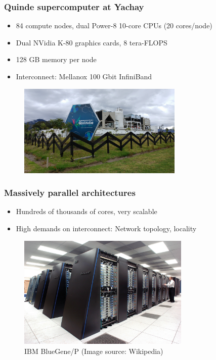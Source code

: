 \documentclass[usenames,dvipsnames,mathserif,compress]{beamer}
\begin{document}
\begin{frame}
  \frametitle{Quinde supercomputer at Yachay}
  \begin{itemize}
  \item 84 compute nodes, dual Power-8 10-core CPUs (20 cores/node)
  \item Dual NVidia K-80 graphics cards, 8 tera-FLOPS
  \item 128 GB memory per node
  \item Interconnect: Mellanox 100 Gbit InfiniBand
  \end{itemize}
  \vspace{-5mm}
  \begin{figure}
  \includegraphics[width=0.7\textwidth]{quinde.jpg}
  \end{figure}
\end{frame}

\begin{frame}
  \frametitle{Massively parallel architectures}
  \begin{itemize}
  \item Hundreds of thousands of cores, very scalable
  \item High demands on interconnect: Network topology, locality
  \end{itemize}
  \begin{figure}
    \includegraphics[width=0.73\textwidth]{IBM_Blue_Gene_P_supercomputer.jpg}
    \caption{IBM BlueGene/P (Image source: Wikipedia)}
  \end{figure}
\end{frame}
\end{document}
